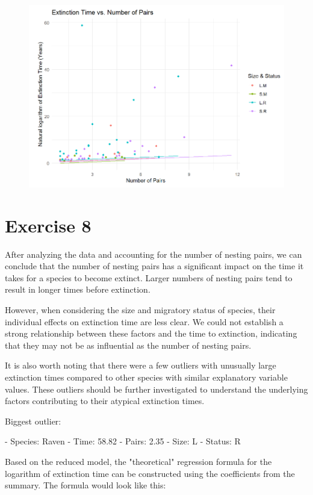 \documentclass{article}
\begin{document}
\begin{figure}
    \includegraphics[width=\linewidth]{graphs/graph7.png}
\end{figure}

\section{Exercise 8}

After analyzing the data and accounting for the number of nesting pairs,
we can conclude that the number of nesting pairs has a significant
impact on the time it takes for a species to become extinct. Larger
numbers of nesting pairs tend to result in longer times before
extinction.

However, when considering the size and migratory status of species,
their individual effects on extinction time are less clear. We could not
establish a strong relationship between these factors and the time to
extinction, indicating that they may not be as influential as the number
of nesting pairs.

It is also worth noting that there were a few outliers with unusually
large extinction times compared to other species with similar
explanatory variable values. These outliers should be further
investigated to understand the underlying factors contributing to their
atypical extinction times.

Biggest outlier:

-   Species: Raven
-   Time: 58.82
-   Pairs: 2.35
-   Size: L
-   Status: R

Based on the reduced model, the "theoretical" regression formula for the
logarithm of extinction time can be constructed using the coefficients
from the summary. The formula would look like this:
\end{document}
